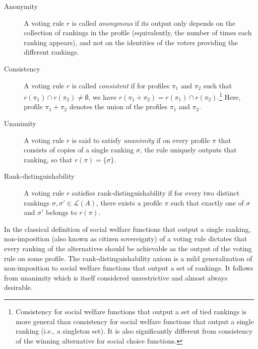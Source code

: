 \documentclass[prodmode]{acmsmall-ec14}
\newcommand{\calL}{{\mathcal{L}}}
\newcommand{\rank}{{\calL(A)}}
\begin{document}
\begin{description}
\item[Anonymity] A voting rule $r$ is called \emph{anonymous} if its output only depends on the collection of rankings in the profile (equivalently, the number of times each ranking appears), and not on the identities of the voters providing the different rankings. \\ %

\item[Consistency] A voting rule $r$ is called \emph{consistent} if for profiles $\pi_1$ and $\pi_2$ such that $r(\pi_1) \cap r(\pi_2) \neq \emptyset$, we have $r(\pi_1+\pi_2) = r(\pi_1) \cap r(\pi_2)$.\footnote{Consistency for social welfare functions that output a set of tied rankings is more general than consistency for social welfare functions that output a single ranking (i.e., a singleton set). It is also significantly different from consistency of the winning alternative for social choice functions.} Here, profile $\pi_1+\pi_2$ denotes the union of the profiles $\pi_1$ and $\pi_2$. \\ %

\item[Unanimity] A voting rule $r$ is said to satisfy \emph{unanimity} if on every profile $\pi$ that consists of copies of a single ranking $\sigma$, the rule uniquely outputs that ranking, so that $r(\pi) = \{\sigma\}$.\\ %

\item[Rank-distinguishability] A voting rule $r$ satisfies rank-distinguishability if for every two distinct rankings $\sigma, \sigma' \in \rank$, there exists a profile $\pi$ such that exactly one of $\sigma$ and $\sigma'$ belongs to $r(\pi)$. 
\end{description}

\noindent
In the classical definition of social welfare functions that output a single ranking, non-imposition (also known as citizen sovereignty) of a voting rule dictates that every ranking of the alternatives should be achievable as the output of the voting rule on some profile. The rank-distinguishability axiom is a mild generalization of non-imposition to social welfare functions that output a set of rankings. It follows from unanimity which is itself considered unrestrictive and almost always desirable.
\end{document}
